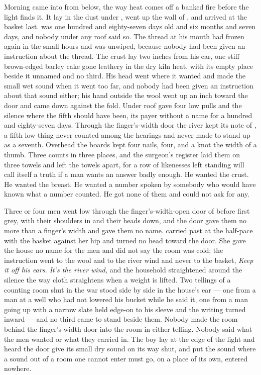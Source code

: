 
Morning came into  from below, the way heat comes off a banked fire before the light finds it. It lay in the dust under , went up the wall of , and arrived at the basket last.  was one hundred and eighty-seven days old and six months and seven days, and nobody under any roof said so. The thread at his mouth had frozen again in the small hours and was unwiped, because nobody had been given an instruction about the thread. The crust lay two inches from his ear, one stiff brown-edged barley cake gone leathery in the dry kiln heat, with its empty place beside it unnamed and no third. His head went where it wanted and made the small wet sound when it went too far, and nobody had been given an instruction about that sound either; his hand outside the wool went up an inch toward the door and came down against the fold. Under  roof  gave four low pulls and the silence where the fifth should have been, its payer without a name for a hundred and eighty-seven days. Through the finger's-width door the river kept its note of , a fifth low thing never counted among the hearings and never made to stand up as a seventh. Overhead the boards kept four nails, four, and a knot the width of a thumb. Three counts in three places, and the surgeon's register laid them on three towels and left the towels apart, for a row of likenesses left standing will call itself a truth if a man wants an answer badly enough. He wanted the crust. He wanted the breast. He wanted a number spoken by somebody who would have known what a number counted. He got none of them and could not ask for any.

Three or four men went low through the finger's-width-open door of  before first grey, with their shoulders in and their heads down, and the door gave them no more than a finger's width and gave them no name.  carried past at the half-pace with the basket against her hip and turned no head toward the door. She gave the house no name for the men and did not say the room was cold; the instruction went to the wool and to the river wind and never to the basket, \emph{Keep it off his ears. It's the river wind,} and the household straightened around the silence the way cloth straightens when a weight is lifted. Two tellings of a counting room shut in the war stood side by side in the house's ear --- one from a man at a well who had not lowered his bucket while he said it, one from a man going up  with a narrow slate held edge-on to his sleeve and the writing turned inward --- and no third came to stand beside them. Nobody made the room behind the finger's-width door into the room in either telling. Nobody said what the men wanted or what they carried in. The boy lay at the edge of the light and heard the door give its small dry sound on its way shut, and put the sound where a sound out of a room one cannot enter must go, on a place of its own, entered nowhere.

